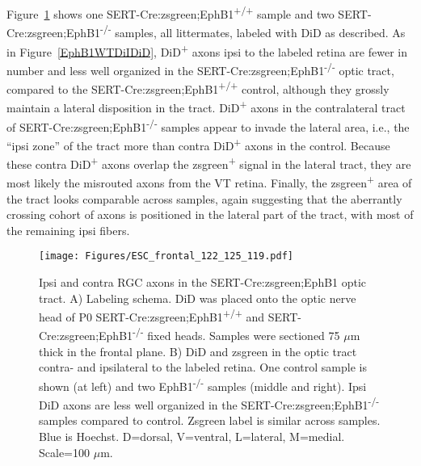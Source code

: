 Figure~\ref{ESCfrontal} shows one SERT-Cre:zsgreen;EphB1\textsuperscript{+/+} sample and two SERT-Cre:zsgreen;EphB1\textsuperscript{-/-} samples, all littermates, labeled with DiD as described.
As in Figure~\ref{EphB1WTDiIDiD}, DiD\textsuperscript{+} axons ipsi to the labeled retina are fewer in number and less well organized in the SERT-Cre:zsgreen;EphB1\textsuperscript{-/-} optic tract, compared to the SERT-Cre:zsgreen;EphB1\textsuperscript{+/+} control, although they grossly maintain a lateral disposition in the tract.
DiD\textsuperscript{+} axons in the contralateral tract of SERT-Cre:zsgreen;EphB1\textsuperscript{-/-} samples appear to invade the lateral area, i.e., the ``ipsi zone'' of the tract more than contra DiD\textsuperscript{+} axons in the control.
Because these contra DiD\textsuperscript{+} axons overlap the zsgreen\textsuperscript{+} signal in the lateral tract, they are most likely the misrouted axons from the VT retina.
Finally, the zsgreen\textsuperscript{+} area of the tract looks comparable across samples, again suggesting that the aberrantly crossing cohort of axons is positioned in the lateral part of the tract, with most of the remaining ipsi fibers.
\begin{figure}[hbtp]
    \begin{center}
        \texttt{[image: Figures/ESC\_frontal\_122\_125\_119.pdf]}
        \caption[Ipsi and contra RGC axons in the SERT-Cre:zsgreen;EphB1 optic tract.]
        {Ipsi and contra RGC axons in the SERT-Cre:zsgreen;EphB1 optic tract.
        A) Labeling schema.
        DiD was placed onto the optic nerve head of P0 SERT-Cre:zsgreen;EphB1\textsuperscript{+/+} and SERT-Cre:zsgreen;EphB1\textsuperscript{-/-} fixed heads.
        Samples were sectioned 75 $\mu$m thick in the frontal plane.
        B) DiD and zsgreen in the optic tract contra- and ipsilateral to the labeled retina.
        One control sample is shown (at left) and two EphB1\textsuperscript{-/-} samples (middle and right).
        Ipsi DiD axons are less well organized in the SERT-Cre:zsgreen;EphB1\textsuperscript{-/-} samples compared to control.
        Zsgreen label is similar across samples.
        Blue is Hoechst.
        D=dorsal, V=ventral, L=lateral, M=medial.
        Scale=100 $\mu$m.}
        \label{ESCfrontal}
    \end{center}
\end{figure}

